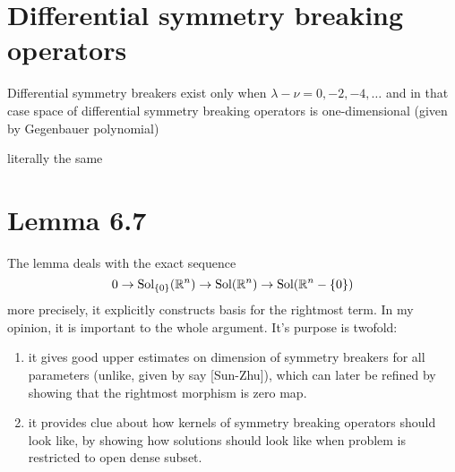 \documentclass[8pt,pdf,notes]{beamer}
\newcommand{\Sol}{\mbox{Sol}}
\theoremstyle{mystyle}
\begin{document}
\section{Differential symmetry breaking operators}
\begin{frame}
\begin{theorem}
	Differential symmetry breakers exist only when $\lambda-\nu=0,-2,-4,\hdots$ and in that case space of
	differential symmetry breaking operators is one-dimensional (given by Gegenbauer polynomial)
\end{theorem}
\begin{theorem}[$O(p,q),\;n:=(p-1)+(q-1)$]
	literally the same
\end{theorem}
\end{frame}
\section{Lemma 6.7}
\begin{frame}
	The lemma deals with the exact sequence
	\[0\rightarrow \Sol_{\mycbra{0}}(\R^n)\rightarrow \Sol(\R^n)\rightarrow\Sol(\R^n-\mycbra{0})\]
	more precisely, it explicitly constructs basis for the rightmost term.
In my opinion, it is important to the whole argument. It's purpose is twofold:
\begin{enumerate}
	\item it gives good upper estimates on dimension of symmetry breakers for all parameters (unlike, given by say [Sun-Zhu]),
		which can later be refined by showing that the rightmost morphism is zero map.
	\item it provides clue about how kernels of symmetry breaking operators should look like, by showing how solutions should
		look like when problem is restricted to open dense subset.
\end{enumerate}
\end{frame}
\end{document}
